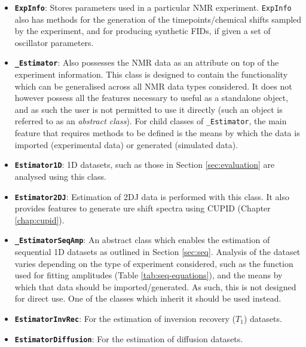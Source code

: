 \begin{itemize}[leftmargin=0pt,label={}]
    \item[] \textbf{\textbf{\texttt{ExpInfo}}}: Stores parameters used in a particular \ac{NMR}
        experiment. \texttt{ExpInfo} also has methods for the generation of the
        timepoints/chemical shifts sampled by the experiment, and for producing
        synthetic \acp{FID}, if given a set of oscillator parameters.
    \item[] \textbf{\texttt{\_Estimator}}: Also possesses the \ac{NMR} data as an
        attribute on top of the experiment information. This class is
        designed to contain the functionality which can be generalised across
        all \ac{NMR} data types considered. It does not however possess all the
        features necessary to useful as a standalone object, and as such the
        user is not permitted to use it directly (such an object is referred to
        as an \emph{abstract class}). For child classes of
        \texttt{\_Estimator}, the main feature that requires methods to be
        defined is the means by which the data is imported (experimental data)
        or generated (simulated data).
    \item[] \textbf{\texttt{Estimator1D}}: \ac{1D} datasets, such as those in
        Section \ref{sec:evaluation} are analysed using this class.
    \item[] \textbf{\texttt{Estimator2DJ}}: Estimation of \ac{2DJ} data is
        performed with this class. It also provides features to generate ure
        shift spectra using \ac{CUPID} (Chapter \ref{chap:cupid}).
    \item[] \textbf{\texttt{\_EstimatorSeqAmp}}: An abstract class
        which enables the estimation of sequential \ac{1D} datasets as outlined
        in Section \ref{sec:seq}. Analysis of the dataset varies depending on
        the type of experiment considered, such as the function used for
        fitting amplitudes (Table \ref{tab:seq-equations}), and the means by
        which that data should be imported/generated. As such, this is not
        designed for direct use. One of the classes which inherit it should be
        used instead.
    \item[] \textbf{\texttt{EstimatorInvRec}}: For the estimation of inversion
        recovery ($T_1$) datasets.
    \item[] \textbf{\texttt{EstimatorDiffusion}}: For the estimation of
        diffusion datasets.
\end{itemize}

